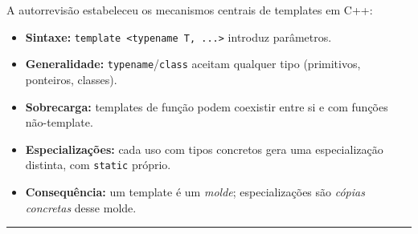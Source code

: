 \documentclass[11pt,a4paper]{article}
\begin{document}
A autorrevisão estabeleceu os mecanismos centrais de templates em C++:

\begin{itemize}[leftmargin=*,itemsep=0pt]
  \item \textbf{Sintaxe:} \texttt{template <typename T, ...>} introduz par\^ametros.
  \item \textbf{Generalidade:} \texttt{typename}/\texttt{class} aceitam qualquer tipo (primitivos, ponteiros, classes).
  \item \textbf{Sobrecarga:} templates de fun\c{c}\~ao podem coexistir entre si e com fun\c{c}\~oes n\~ao-template.
  \item \textbf{Especializa\c{c}\~oes:} cada uso com tipos concretos gera uma especializa\c{c}\~ao distinta, com \texttt{static} pr\'oprio.
  \item \textbf{Conse\-qu\^encia:} um template \'e um \emph{molde}; especializa\c{c}\~oes s\~ao \emph{c\'opias concretas} desse molde.
\end{itemize}

\vspace{1em}
\begin{center}\rule{0.5\textwidth}{0.4pt}\end{center}
\end{document}

